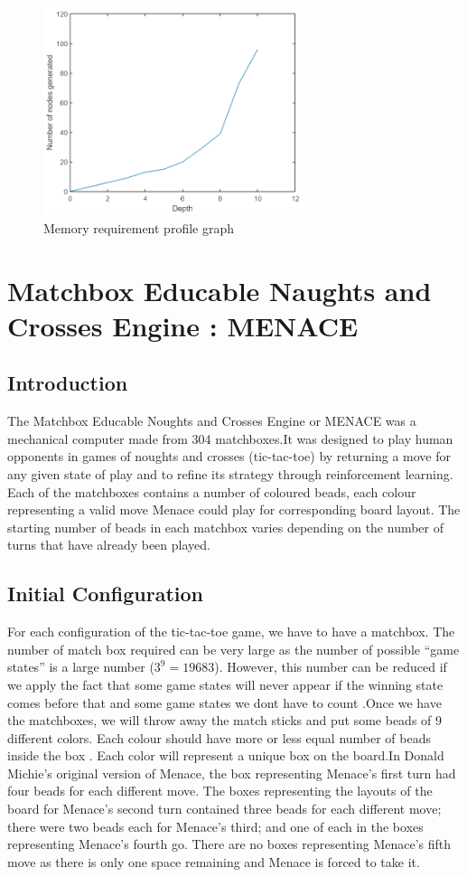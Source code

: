 \documentclass[journal, compsoc]{IEEEtran}
\begin{document}
\begin{figure}[!h]
\centering
\includegraphics[width=3in]{images/graph1.PNG}
\caption{Memory requirement profile graph}
\label{fig_sim}
\end{figure}

\section{Matchbox Educable Naughts and Crosses Engine : MENACE}
\subsection{Introduction}
The Matchbox Educable Noughts and Crosses Engine or MENACE was a mechanical computer made from 304 matchboxes.It was designed to play human opponents in games of noughts and crosses (tic-tac-toe) by returning a move for any given state of play and to refine its strategy through reinforcement learning.
Each of the matchboxes contains a number of coloured
beads, each colour representing a valid move Menace could
play for corresponding board layout. The starting number of
beads in each matchbox varies depending on the number of
turns that have already been played.

\subsection{Initial Configuration}
For each configuration of the tic-tac-toe game, we have to
have a matchbox. The number of match box required can be
very large as the number of possible “game states” is a large
number ($3^{9} = 19683$). However, this number can be reduced
if we apply the fact that some game states will never appear
if the winning state comes before that and some game states
we dont have to count .Once we have the matchboxes, we will
throw away the match sticks and put some beads of 9 different
colors. Each colour should have more or less equal number of
beads inside the box . Each color will represent a unique box
on the board.In Donald Michie’s original version of Menace,
the box representing Menace’s first turn had four beads for
each different move. The boxes representing the layouts of the
board for Menace’s second turn contained three beads for each
different move; there were two beads each for Menace’s third;
and one of each in the boxes representing Menace’s fourth go.
There are no boxes representing Menace’s fifth move as there
is only one space remaining and Menace is forced to take it.
\end{document}
